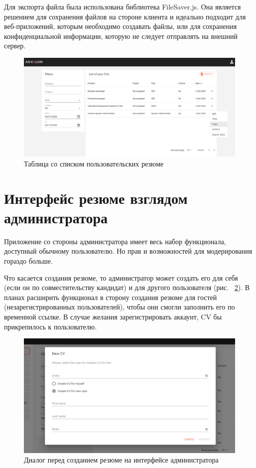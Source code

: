 \documentclass[a4paper,12pt]{diplom}
\begin{document}
Для экспорта файла была использована библиотека FileSaver.js. Она является решением для сохранения файлов на стороне клиента и идеально подходит для веб-приложений, которым необходимо создавать файлы, или для сохранения конфиденциальной информации, которую не следует отправлять на внешний сервер.


\begin{figure}[!ht]
	\centering
	\includegraphics[width=1\textwidth]{resources/cvlistuser.png}
	\caption{Таблица со списком пользовательских резюме}
	\label{14}
\end{figure}

\section{Интерфейс резюме взглядом администратора}

Приложение со стороны администратора имеет весь набор функционала, доступный обычному пользователю. Но прав и возможностей для модерирования гораздо больше.

Что касается создания резюме, то администратор может создать его для себя (если он по совместительству кандидат) и для другого пользователя (рис. ~\ref{15}). В планах расширить функционал в сторону создания резюме для гостей (незарегистрированных пользователей), чтобы 
они смогли заполнить его по временной ссылке. В случае желания зарегистрировать аккаунт, CV бы прикрепилось к пользователю.

\begin{figure}[!ht]
	\centering
	\includegraphics[width=1\textwidth]{resources/newcvdialog.png}
	\caption{Диалог перед созданием резюме на интерфейсе администратора}
	\label{15}
\end{figure}
\end{document}
